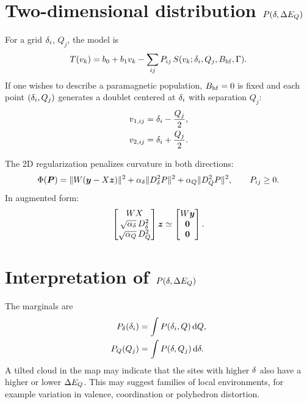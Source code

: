 \section{Two-dimensional distribution $P(\delta,\Delta E_Q)$}

For a grid $\delta_i$, $Q_j$, the model is
\begin{equation}
  T(v_k)=b_0+b_1v_k-\sum_{ij}P_{ij}\,
  S(v_k;\delta_i,Q_j,B_{\mathrm{hf}},\Gamma).
\end{equation}
If one wishes to describe a paramagnetic population, $B_{\mathrm{hf}}=0$ is fixed and each
point $(\delta_i,Q_j)$ generates a doublet centered at $\delta_i$ with separation
$Q_j$:
\begin{align}
  v_{1,ij}&=\delta_i-\frac{Q_j}{2},\\
  v_{2,ij}&=\delta_i+\frac{Q_j}{2}.
\end{align}

The 2D regularization penalizes curvature in both directions:
\begin{equation}
  \Phi(\bm P)=\|W(\bm y-X\bm z)\|^2
  +\alpha_{\delta}\|D_{\delta}^2P\|^2
  +\alpha_Q\|D_Q^2P\|^2,
  \qquad P_{ij}\ge0.
\end{equation}
In augmented form:
\begin{equation}
  \begin{bmatrix}
    WX\\
    \sqrt{\alpha_{\delta}}\,D_{\delta}^2\\
    \sqrt{\alpha_Q}\,D_Q^2
  \end{bmatrix}\bm z\simeq
  \begin{bmatrix}
    W\bm y\\
    \bm 0\\
    \bm 0
  \end{bmatrix}.
\end{equation}

\section{Interpretation of $P(\delta,\Delta E_Q)$}

The marginals are
\begin{align}
  P_{\delta}(\delta_i)&=\int P(\delta_i,Q)\,\mathrm{d} Q,\\
  P_Q(Q_j)&=\int P(\delta,Q_j)\,\mathrm{d}\delta.
\end{align}
A tilted cloud in the map may indicate that the sites with higher $\delta$ also
have a higher or lower $\Delta E_Q$. This may suggest families of local environments,
for example variation in valence, coordination or polyhedron distortion.

